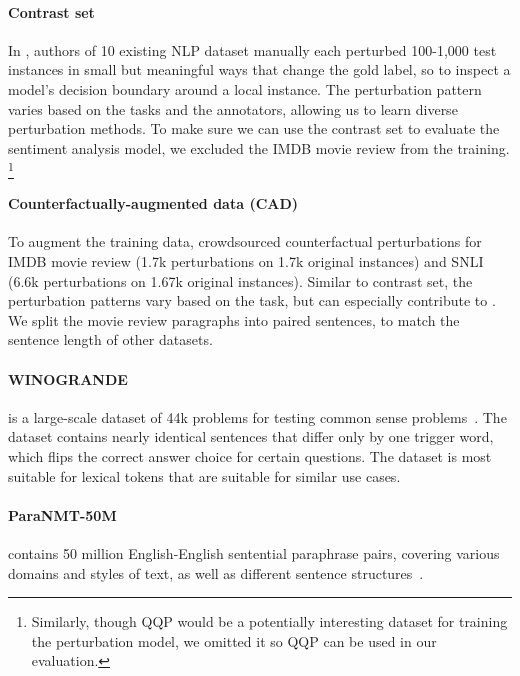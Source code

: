 \paragraph{Contrast set}
In \cite{gardner2020contrast}, authors of 10 existing NLP dataset manually each perturbed 100-1,000 test instances in small but meaningful ways that change the gold label, so to inspect a model's decision boundary around a local instance.
The perturbation pattern varies based on the tasks and the annotators, allowing us to learn diverse perturbation methods.
To make sure we can use the contrast set to evaluate the sentiment analysis model, we excluded the IMDB movie review from the training.
\footnote{Similarly, though QQP would be a potentially interesting dataset for training the perturbation model, we omitted it so QQP can be used in our evaluation.}


\paragraph{Counterfactually-augmented data (CAD)}
To augment the training data, \citet{kaushik2019learning} crowdsourced counterfactual perturbations for IMDB movie review (1.7k perturbations on 1.7k original instances) and SNLI (6.6k perturbations on 1.67k original instances).
Similar to contrast set, the perturbation patterns vary based on the task, but can especially contribute to .
We split the movie review paragraphs into paired sentences, to match the sentence length of other datasets.


\paragraph{WINOGRANDE} is a large-scale dataset of 44k problems for testing common sense problems~\cite{sakaguchi2019winogrande}.
The dataset contains nearly identical sentences that differ only by one trigger word, which flips the correct answer choice for certain questions.
The dataset is most suitable for lexical tokens that are suitable for similar use cases.

\paragraph{ParaNMT-50M} contains 50 million English-English sentential paraphrase pairs, covering various domains and styles of text, as well as different sentence structures~\citet{wieting2017paranmt}. 

